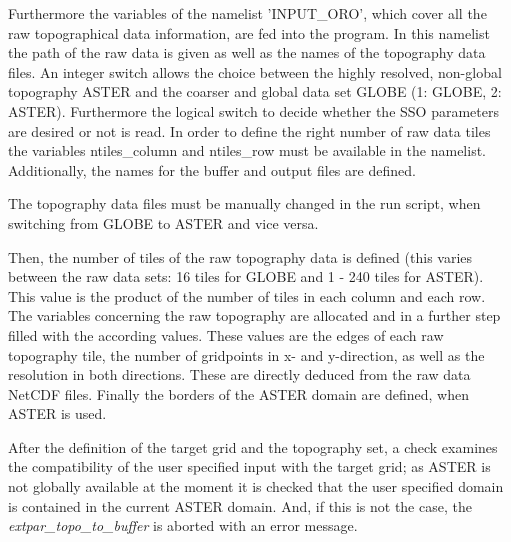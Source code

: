 \documentclass[a4paper,10pt,DIV14,BCOR1cm,titlepage,twoside]{scrartcl}
\begin{document}
Furthermore the variables of the namelist 'INPUT\_ORO', which cover all the raw topographical data information, are fed into the program. In this namelist the path of the raw data is given as well as the names of the topography data files. An integer switch allows the choice between the highly resolved, non-global topography ASTER and the coarser and global data set GLOBE (1: GLOBE, 2: ASTER). Furthermore the logical switch to decide whether the SSO parameters are desired or not is read. In order to define the right number of raw data tiles the variables ntiles\_column and ntiles\_row must be available in the namelist. Additionally, the names for the buffer and output files are defined.\par\medskip\noindent
The topography data files must be manually changed in the run script, when switching from GLOBE to ASTER and vice versa.\par\medskip\noindent
Then, the number of tiles of the raw topography data is defined (this varies between the raw data sets: 16 tiles for GLOBE and 1 - 240 tiles for ASTER). This value is the product of the number of tiles in each column and each row. The variables concerning the raw topography are allocated and in a further step filled with the according values. These values are the edges of each raw topography tile, the number of gridpoints in x- and y-direction, as well as the resolution in both directions. These are directly deduced from the raw data NetCDF files. Finally the borders of the ASTER domain are defined, when ASTER is used.\par\medskip\noindent
After the definition of the target grid and the topography set, a check examines the compatibility of the user specified input with the target grid; as ASTER is not globally available at the moment it is checked that the user specified domain is contained in the current ASTER domain. And, if this is not the case, the \textit{extpar\_topo\_to\_buffer} is aborted with an error message.\par\medskip\noindent
\end{document}
